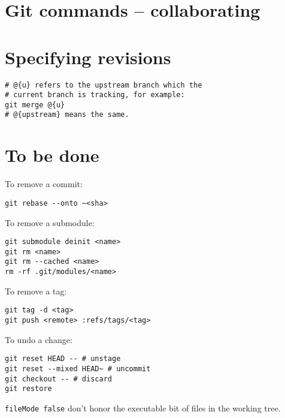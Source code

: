 \documentclass{charuun}
\begin{document}
\section{Git commands -- collaborating}





\section{Specifying revisions}
\begin{verbatim}
# @{u} refers to the upstream branch which the
# current branch is tracking, for example:
git merge @{u}
# @{upstream} means the same.
\end{verbatim}

\section{To be done}
To remove a commit:
\begin{verbatim}
git rebase --onto ~<sha>
\end{verbatim}

To remove a submodule:
\begin{verbatim}
git submodule deinit <name>
git rm <name>
git rm --cached <name>
rm -rf .git/modules/<name>
\end{verbatim}

To remove a tag:
\begin{verbatim}
git tag -d <tag>
git push <remote> :refs/tags/<tag>
\end{verbatim}

To undo a change:
\begin{verbatim}
git reset HEAD -- # unstage
git reset --mixed HEAD~ # uncommit
git checkout -- # discard
git restore
\end{verbatim}


\texttt{fileMode false} don't honor the executable bit of files in the working tree.
\end{document}
